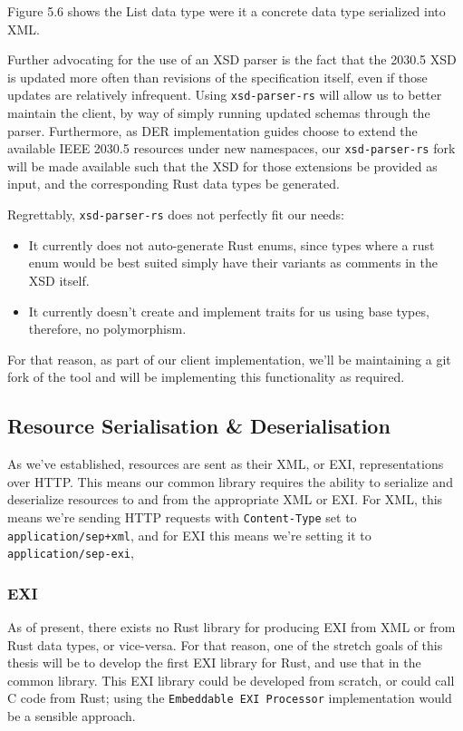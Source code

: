 Figure 5.6 shows the List data type were it a concrete data type serialized into XML.

Further advocating for the use of an XSD parser is the fact that the 2030.5 XSD is updated more often than revisions of the specification itself, even if those updates are relatively infrequent.
Using \texttt{xsd-parser-rs} will allow us to better maintain the client, by way of simply running updated schemas through the parser.
Furthermore, as DER implementation guides choose to extend the available IEEE 2030.5 resources under new namespaces, 
our \texttt{xsd-parser-rs} fork will be made available such that the XSD for those extensions be provided as input, and the corresponding Rust data types be generated.

Regrettably, \texttt{xsd-parser-rs} does not perfectly fit our needs:
\begin{itemize}
    \item It currently does not auto-generate Rust enums, since types where a rust enum would be best suited simply have their variants as comments in the XSD itself.
    \item It currently doesn't create and implement traits for us using base types, therefore, no polymorphism.
\end{itemize}

For that reason, as part of our client implementation, we'll be maintaining a git fork of the tool and will be implementing this functionality as required.


\subsection{Resource Serialisation \& Deserialisation}
As we've established, resources are sent as their XML, or EXI, representations over HTTP. This means our common library requires the ability to serialize and deserialize resources to and from the appropriate XML or EXI.
For XML, this means we're sending HTTP requests with \texttt{Content-Type} set to \texttt{application/sep+xml}, and for EXI this means we're setting it to \texttt{application/sep-exi},

\subsubsection{EXI}
As of present, there exists no Rust library for producing EXI from XML or from Rust data types, or vice-versa. For that reason, one of the stretch goals of this thesis will be to develop the first EXI library for Rust, and use that in the common library.
This EXI library could be developed from scratch, or could call C code from Rust; using the \texttt{Embeddable EXI Processor} implementation would be a sensible approach.

